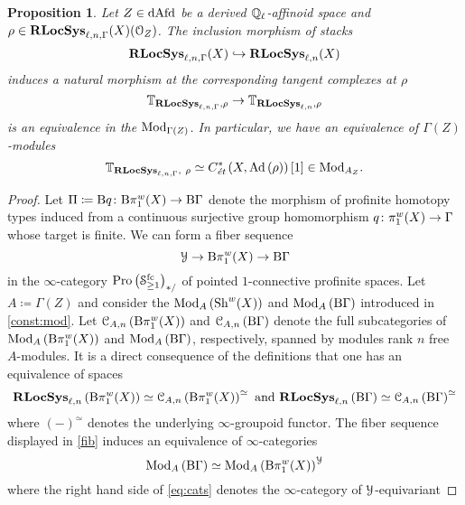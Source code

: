\documentclass[10pt,a4paper]{amsart}
\numberwithin{equation}{subsection}
\theoremstyle{plain}
\newtheorem{prop}[theorem]{Proposition}
\theoremstyle{definition}
\theoremstyle{remark}
\numberwithin{equation}{section}
\begin{document}
\begin{prop} \label{tang_comp}
Let $Z \in \mathrm{dAfd}$ be a derived $\mathbb Q_\ell$-affinoid space and $\rho \in \mathbf R \mathbf{LocSys}_{\ell, n, \Gamma}( X)(\mathcal{O}_Z)$. The inclusion morphism of stacks 
	\[
	 	\mathbf R \mathbf{LocSys}_{\ell, n, \Gamma}(X) \hookrightarrow \mathbf R \mathbf{LocSys}_{\ell, n}(X)
	\]
induces a natural morphism at the corresponding tangent complexes at $\rho$
	\[
		\mathbb T_{\mathbf R \mathbf{LocSys}_{\ell, n, \Gamma},  \rho} \to \mathbb T_{\mathbf R \mathbf{LocSys}_{\ell, n},  \rho}
	\]
is an equivalence in the \infcat $\mathrm{Mod}_{\Gamma(Z)}$. In particular, we have an equivalence of $\Gamma(Z)$-modules
	\[
		\mathbb T_{\mathbf R \mathbf{LocSys}_{\ell, n, \Gamma}, \  \rho} \simeq C^*_{\emph{\text{\'et}}} \left( X , \mathrm{Ad}  \left( \rho  \right)  \right) [1] \in \mathrm{Mod}_{A_Z}.
	\]
\end{prop}


\begin{proof}
Let  $\Pi \coloneqq \mathrm{B} q \colon \mathrm B \pi_1^w ( X) \to \mathrm B \Gamma$ denote the morphism of profinite homotopy types induced from a continuous surjective group homomorphism $q \colon \pi_1^w(X) \to \Gamma$ whose target is finite.
We can form a fiber sequence
	\begin{equation} \label{fib}
		\mathcal Y \to \mathrm B \pi_1^w(X) \to \mathrm B \Gamma
	\end{equation}
in the $\infty$-category $\mathrm{Pro} \left( \mathcal S^{\mathrm{fc}}_{\geq 1} \right)_{*/}$ of pointed $1$-connective profinite spaces. Let $A \coloneqq \Gamma(Z)$ and
consider the \infcats $\mathrm{Mod}_A \left( \mathrm{Sh}^w( X) \right)$ and $\mathrm{Mod}_A \left( \mathrm B \Gamma \right)$ introduced in \cref{const:mod}. 
Let $\mathcal C_{A, n} \left( \mathrm B \pi_1^w(X) \right)$ and $\mathcal C_{A, n} \left( \mathrm B \Gamma \right)$ denote the full subcategories of $\mathrm{Mod}_A \left( \mathrm B \pi_1^w( X) \right)$ and $\mathrm{Mod}_A \left( \mathrm B \Gamma \right)$,
respectively, spanned by modules rank
$n$
free $A$-modules. It is a direct consequence of the definitions that one has an equivalence of spaces 
	\[
		\mathbf R \mathbf{LocSys}_{\ell, n} \left( \mathrm B \pi_1^w(X) \right) \simeq \mathcal C_{A, n} \left( \mathrm B \pi_1^w(X) \right)^{\simeq} \text{ and } \mathbf R \mathbf{LocSys}_{\ell, n} \left( \mathrm B \Gamma \right) \simeq \mathcal C_{A, n } \left( \mathrm B \Gamma \right)^{\simeq}
	\]
where $(-)^{\simeq}$ denotes the underlying $\infty$-groupoid functor.
The fiber sequence displayed in \eqref{fib} induces an equivalence of $\infty$-categories
	\begin{equation} \label{eq:cats}
		\mathrm{Mod}_A \left( \mathrm B \Gamma \right) \simeq \mathrm{Mod}_A \left( \mathrm B \pi_1^w(X) \right)^\mathcal Y
	\end{equation}
where the right hand side of \eqref{eq:cats} denotes the $\infty$-category of $\mathcal Y$-equivariant

\end{proof}
\end{document}
